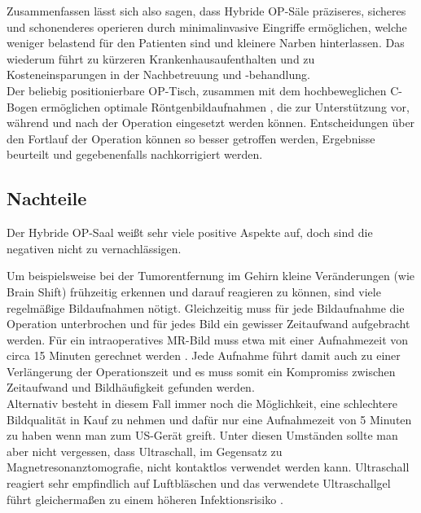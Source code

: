 

Zusammenfassen lässt sich also sagen, dass Hybride OP-Säle präziseres, sicheres und schonenderes operieren \cite{DresdnerUniklinikum} durch minimalinvasive Eingriffe ermöglichen, welche weniger belastend für den Patienten sind und kleinere Narben hinterlassen. Das wiederum  führt zu kürzeren Krankenhausaufenthalten und zu Kosteneinsparungen in der Nachbetreuung und -behandlung. \\
Der beliebig positionierbare OP-Tisch, zusammen mit dem hochbeweglichen C-Bogen  ermöglichen optimale Röntgenbildaufnahmen \cite{DresdnerUniklinikum}, die zur Unterstützung vor, während und nach der Operation eingesetzt werden können. Entscheidungen über den Fortlauf der Operation können so besser getroffen werden, Ergebnisse beurteilt und gegebenenfalls nachkorrigiert werden.

\subsection{Nachteile}

Der Hybride OP-Saal weißt sehr viele positive Aspekte auf, doch sind die negativen nicht zu vernachlässigen.

Um beispielsweise bei der Tumorentfernung im Gehirn kleine Veränderungen (wie Brain Shift) frühzeitig erkennen und darauf reagieren zu können, sind viele regelmäßige Bildaufnahmen nötigt. Gleichzeitig muss für jede Bildaufnahme die Operation unterbrochen und für jedes Bild ein gewisser Zeitaufwand aufgebracht werden. Für ein intraoperatives MR-Bild muss etwa mit einer Aufnahmezeit von circa 15 Minuten gerechnet werden \cite{BrainShiftInTumorResection}. Jede Aufnahme führt damit auch zu einer Verlängerung der Operationszeit und es muss somit ein Kompromiss zwischen Zeitaufwand und Bildhäufigkeit gefunden werden.\\
Alternativ besteht in diesem Fall immer noch die Möglichkeit, eine schlechtere Bildqualität in Kauf zu nehmen und dafür nur eine Aufnahmezeit von 5 Minuten zu haben wenn man zum US-Gerät greift. Unter diesen Umständen sollte man aber nicht vergessen, dass Ultraschall, im Gegensatz zu Magnetresonanztomografie, nicht kontaktlos verwendet werden kann. Ultraschall reagiert sehr empfindlich auf Luftbläschen und das verwendete Ultraschallgel führt gleichermaßen zu einem höheren Infektionsrisiko \cite{BrainShiftInTumorResection}. 


